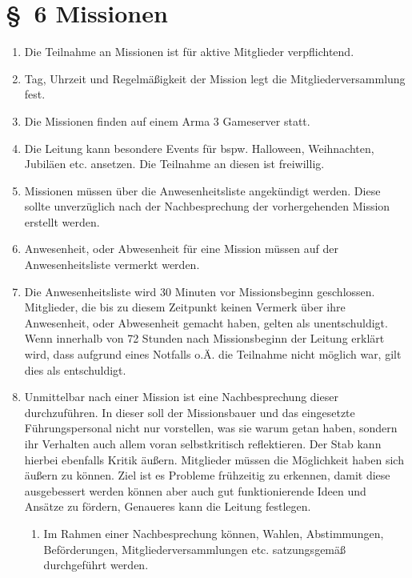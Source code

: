 \section*{\S~6 Missionen}
\label{sec:missionen}

\begin{enumerate}[label=(\arabic*)]
    \item Die Teilnahme an Missionen ist für aktive Mitglieder verpflichtend.    
    \item Tag, Uhrzeit und Regelmäßigkeit der Mission legt die Mitgliederversammlung fest.    
    \item Die Missionen finden auf einem Arma 3 Gameserver statt.    
    \item Die Leitung kann besondere Events für bspw. Halloween, Weihnachten, Jubiläen etc. ansetzen. Die Teilnahme an diesen ist freiwillig.    
    \item Missionen müssen über die Anwesenheitsliste angekündigt werden. Diese sollte unverzüglich nach der Nachbesprechung der vorhergehenden Mission erstellt werden.   
    \item Anwesenheit, oder Abwesenheit für eine Mission müssen auf der Anwesenheitsliste vermerkt werden.
    \item Die Anwesenheitsliste wird 30 Minuten vor Missionsbeginn geschlossen. Mitglieder, die bis zu diesem Zeitpunkt keinen Vermerk über ihre Anwesenheit, oder Abwesenheit gemacht haben, gelten als unentschuldigt. Wenn innerhalb von 72 Stunden nach Missionsbeginn der Leitung erklärt wird, dass aufgrund eines Notfalls o.Ä. die Teilnahme nicht möglich war, gilt dies als entschuldigt.   
    \item Unmittelbar nach einer Mission ist eine Nachbesprechung dieser durchzuführen. In dieser soll der Missionsbauer und das eingesetzte Führungspersonal nicht nur vorstellen, was sie warum getan haben, sondern ihr Verhalten auch allem voran selbstkritisch reflektieren. Der Stab kann hierbei ebenfalls Kritik äußern. Mitglieder müssen die Möglichkeit haben sich äußern zu können. Ziel ist es Probleme frühzeitig zu erkennen, damit diese ausgebessert werden können aber auch gut funktionierende Ideen und Ansätze zu fördern, Genaueres kann die Leitung festlegen.    
    \begin{enumerate}[label=(\Alph*)]
    	\item Im Rahmen einer Nachbesprechung können, Wahlen, Abstimmungen, Beförderungen, Mitgliederversammlungen etc. satzungsgemäß durchgeführt werden.
    \end{enumerate}

\end{enumerate}
